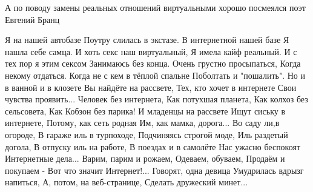 А по поводу замены реальных отношений виртуальными хорошо посмеялся поэт  Евгений Бранц

\begin{multicols}{2}
\obeycr
Я на нашей автобазе
Поутру слилась в экстазе.
В интернетной нашей базе
Я нашла себе самца.
\smallskip
И хоть секс наш виртуальный,
Я имела кайф реальный.
И с тех пор я этим сексом
Занимаюсь без конца.
\smallskip
Очень грустно просыпаться,
Когда некому отдаться.
Когда не с кем в тёплой спальне
Поболтать и "пошалить".
\smallskip
Но и в ванной и в клозете
Вы найдёте на рассвете,
Тех, кто хочет в интернете
Свои чувства проявить...
\smallskip
Человек без интернета,
Как потухшая планета,
Как колхоз без сельсовета,
Как Кобзон без парика!
\smallskip
И младенцы на рассвете
Ищут сиську в интернете,
Потому, как сеть родная
Им, как мамка, дорога...
\smallskip
Во саду ли,в огороде,
В гараже иль в турпоходе,
Подчиняясь строгой моде,
Иль раздетый догола,
\smallskip
В отпуску иль на работе,
В поездах и в самолёте 
Нас ужасно беспокоят
Интернетные дела...
\smallskip
Варим, парим и рожаем,
Одеваем, обуваем,
Продаём и покупаем -
Вот что значит Интернет!...
\smallskip
Говорят, одна девица
Умудрилась вдрызг напиться,
А, потом, на веб-странице,
Сделать дружеский минет...
\restorecr
\end{multicols}
